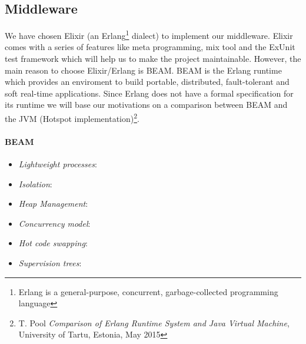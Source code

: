 \subsection{Middleware}
We have chosen Elixir (an Erlang\footnote{Erlang is a general-purpose, 
concurrent, garbage-collected programming language} dialect) to implement 
our middleware. Elixir comes with a series of features like meta programming, 
mix tool and the ExUnit test framework which will help us to make 
the project maintainable.
However, the main reason to choose Elixir/Erlang is BEAM.
BEAM is the Erlang runtime which provides an enviroment to build portable, 
distributed, fault-tolerant and soft real-time applications.
Since Erlang does not have a formal specification for its runtime we will
 base our motivations on a comparison between BEAM and the JVM 
(Hotspot implementation)\footnote{T. Pool \textit{Comparison of Erlang Runtime 
System and Java Virtual Machine}, University of Tartu, Estonia, May 2015}.

\paragraph{BEAM}
\begin{itemize}
    \item \textit{Lightweight processes}: 
    \item \textit{Isolation}:
    \item \textit{Heap Management}:
    \item \textit{Concurrency model}:
    \item \textit{Hot code swapping}:
    \item \textit{Supervision trees}: 
\end{itemize}
